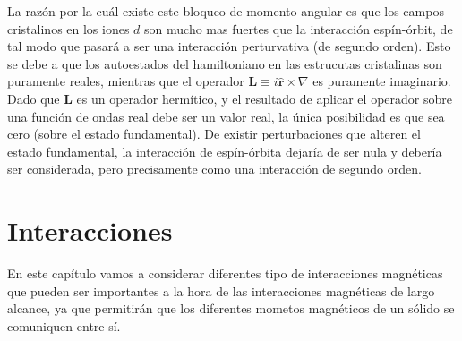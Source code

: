 \documentclass[12pt,a4paper]{book}
\numberwithin{equation}{section}
\numberwithin{figure}{section}
\newcommand{\rn}{\mathbf{r}}
\newcommand{\Ln}{\mathbf{L}}
\newcommand{\hnr}{\hat{\rn}}
\begin{document}
La razón por la cuál existe este bloqueo de momento angular es que los campos cristalinos en los iones $d$ son mucho mas fuertes que la interacción espín-órbit, de tal modo que pasará a ser una interacción perturvativa (de segundo orden). Esto se debe a que los autoestados del hamiltoniano en las estrucutas cristalinas son puramente reales, mientras que el operador $\Ln \equiv i\hnr \times \nabla$ es puramente imaginario. Dado que $\Ln$ es un operador hermítico, y el resultado de aplicar el operador sobre una función de ondas real debe ser un valor real, la única posibilidad es que sea cero (sobre el estado fundamental). De existir perturbaciones que alteren el estado fundamental, la interacción de espín-órbita dejaría de ser nula y debería ser considerada, pero precisamente como una interacción de segundo orden.  





\newpage
\chapter{Interacciones}

En este capítulo vamos a considerar diferentes tipo de interacciones magnéticas que pueden ser importantes a la hora de las interacciones magnéticas de largo alcance, ya que permitirán que los diferentes mometos magnéticos de un sólido se comuniquen entre sí.
\end{document}
